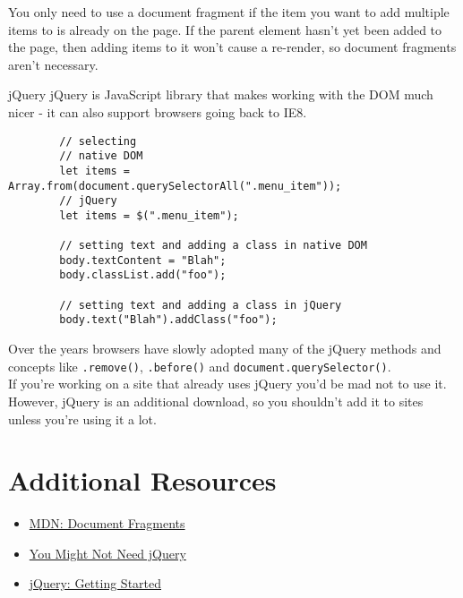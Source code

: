 You only need to use a document fragment if the item you want to add multiple items to is already on the page. If the parent element hasn't yet been added to the page, then adding items to it won't cause a re-render, so document fragments aren't necessary.

\pagebreak

\begin{infobox}{jQuery}
    jQuery is JavaScript library that makes working with the DOM much nicer - it can also support browsers going back to IE8.

    \begin{verbatim}
        // selecting
        // native DOM
        let items = Array.from(document.querySelectorAll(".menu_item"));
        // jQuery
        let items = $(".menu_item");

        // setting text and adding a class in native DOM
        body.textContent = "Blah";
        body.classList.add("foo");

        // setting text and adding a class in jQuery
        body.text("Blah").addClass("foo");
    \end{verbatim}

    Over the years browsers have slowly adopted many of the jQuery methods and concepts like \texttt{.remove()}, \texttt{.before()} and \texttt{document.querySelector()}.
    \\

    If you're working on a site that already uses jQuery you'd be mad not to use it. However, jQuery is an additional download, so you shouldn't add it to sites unless you're using it a lot.
\end{infobox}



\section{Additional Resources}

\begin{itemize}[leftmargin=*]
    \item \href{https://developer.mozilla.org/en-US/docs/Web/API/Document/createDocumentFragment}{MDN: Document Fragments}
    \item \href{https://css-tricks.com/now-ever-might-not-need-jquery/}{You Might Not Need jQuery}
    \item \href{https://www.elated.com/articles/jquery-getting-started/}{jQuery: Getting Started}
\end{itemize}
